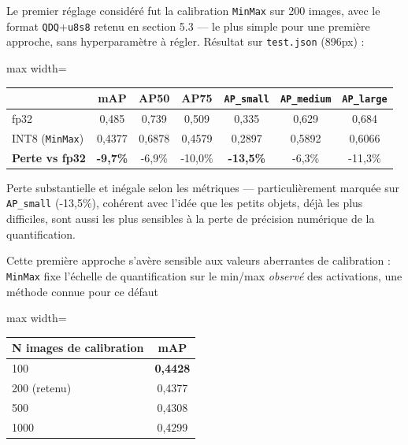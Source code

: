 \documentclass[11pt,a4paper]{article}
\begin{document}
    Le premier réglage considéré fut la calibration
    \texttt{MinMax} sur 200 images, avec le format \texttt{QDQ}+\texttt{u8s8}
    retenu en section 5.3 --- le plus simple pour une première approche,
    sans hyperparamètre à régler. Résultat sur \texttt{test.json}
    (896px) :
    
    \begin{table}[!htbp]
    \centering
    \small
    \begin{adjustbox}{max width=\linewidth}
    \begin{tabular}{@{}lcccccc@{}}
    \toprule
    & \textbf{mAP} & \textbf{AP50} & \textbf{AP75} & \textbf{\texttt{AP\_small}} & \textbf{\texttt{AP\_medium}} & \textbf{\texttt{AP\_large}} \\
    \midrule
    fp32 & 0,485 & 0,739 & 0,509 & 0,335 & 0,629 & 0,684 \\
    INT8 (\texttt{MinMax}) & 0,4377 & 0,6878 & 0,4579 & 0,2897 & 0,5892 & 0,6066 \\
    \midrule
    \textbf{Perte vs fp32} & \textbf{-9,7\%} & -6,9\% & -10,0\% & \textbf{-13,5\%} & -6,3\% & -11,3\% \\
    \bottomrule
    \end{tabular}
    \end{adjustbox}
    \end{table}
    
    Perte substantielle et inégale selon les métriques --- particulièrement
    marquée sur \texttt{AP\_small} (-13,5\%), cohérent avec l'idée que les
    petits objets, déjà les plus difficiles, sont aussi les plus sensibles
    à la perte de précision numérique de la quantification.
    
    Cette première approche s'avère sensible aux valeurs
    aberrantes de calibration : \texttt{MinMax} fixe l'échelle de
    quantification sur le min/max \emph{observé} des activations, une
    méthode connue pour ce défaut
    
    \begin{table}[!htbp]
    \centering
    \small
    \begin{adjustbox}{max width=\linewidth}
    \begin{tabular}{@{}lc@{}}
    \toprule
    \textbf{N images de calibration} & \textbf{mAP} \\
    \midrule
    100 & \textbf{0,4428} \\
    200 (retenu) & 0,4377 \\
    500 & 0,4308 \\
    1000 & 0,4299 \\
    \bottomrule
    \end{tabular}
    \end{adjustbox}
    \end{table}
    
\end{document}
